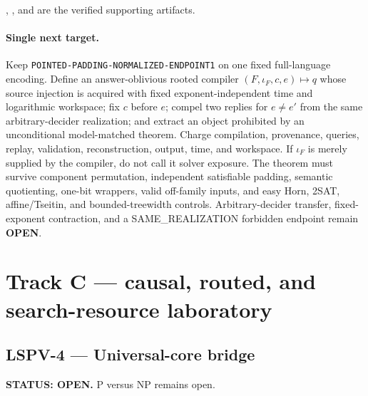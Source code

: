 \documentclass[11pt]{article}
\begin{document}
,
, and
are the verified supporting artifacts.

\paragraph{Single next target.}
Keep \texttt{POINTED-PADDING-NORMALIZED-ENDPOINT1} on one fixed full-language
encoding.  Define an answer-oblivious rooted compiler
\((F,\iota_F,c,e)\mapsto q\) whose source injection is acquired with fixed
exponent-independent time and logarithmic workspace; fix \(c\) before \(e\);
compel two replies for \(e\ne e'\) from the same arbitrary-decider
realization; and extract an object prohibited by an unconditional
model-matched theorem.  Charge compilation, provenance, queries, replay,
validation, reconstruction, output, time, and workspace.  If \(\iota_F\) is
merely supplied by the compiler, do not call it solver exposure.  The theorem
must survive component permutation, independent satisfiable padding, semantic
quotienting, one-bit wrappers, valid off-family inputs, and easy Horn, 2SAT,
affine/Tseitin, and bounded-treewidth controls.  Arbitrary-decider transfer,
fixed-exponent contraction, and a SAME\_REALIZATION forbidden endpoint remain
\textbf{OPEN}.

\section{Track C --- causal, routed, and search-resource laboratory}

\subsection{LSPV-4 --- Universal-core bridge}
\textbf{STATUS: OPEN.} P versus NP remains open.
\end{document}
